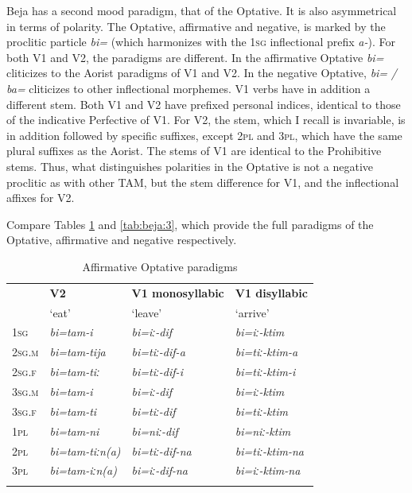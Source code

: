 \documentclass[output=paper,colorlinks,citecolor=brown]{langscibook}
\begin{document}
Beja has a second mood paradigm, that of the Optative. It is also asymmetrical in terms of polarity. The Optative, affirmative and negative, is marked by the proclitic particle \textit{bi=} (which harmonizes with the 1\textsc{sg} inflectional prefix \textit{a-}). For both V1 and V2, the paradigms are different. In the affirmative Optative \textit{bi=} cliticizes to the Aorist paradigms of V1 and V2. In the negative Optative, \textit{bi=} \textit{/ ba=} cliticizes to other inflectional morphemes. V1 verbs have in addition a different stem. Both V1 and V2 have prefixed personal indices, identical to those of the indicative Perfective of V1. For V2, the stem, which I recall is invariable, is in addition followed by specific suffixes, except 2\textsc{pl} and 3\textsc{pl}, which have the same plural suffixes as the Aorist. The stems of V1 are identical to the Prohibitive stems. Thus, what distinguishes polarities in the Optative is not a negative proclitic as with other TAM, but the stem difference for V1, and the inflectional affixes for V2.

Compare Tables \ref{tab:beja:2} and \ref{tab:beja:3}, which provide the full paradigms of the Optative, affirmative and negative respectively.

\begin{table}
\begin{tabularx}{\textwidth}{lXXl}
\lsptoprule 
& {\bfseries V2} & {\bfseries V1 monosyllabic} & {\bfseries V1 disyllabic} \\
& { ‘eat’} & { ‘leave’} & { ‘arrive’}\\
\midrule 
{\scshape 1sg} & \textit{bi=tam-i} & \textit{bi=iː-dif} & \textit{bi=iː-ktim}\\
{\scshape 2sg.m} & \textit{bi=tam-tija} & \textit{bi=tiː-dif-a} & \textit{bi=tiː-ktim-a}\\
{\scshape 2sg.f} & \textit{bi=tam-tiː} & \textit{bi=tiː-dif-i} & \textit{bi=tiː-ktim-i}\\
{\scshape 3sg.m} & \textit{bi=tam-i} & \textit{bi=iː-dif} & \textit{bi=iː-ktim}\\
{\scshape 3sg.f} & \textit{bi=tam-ti} & \textit{bi=tiː-dif} & \textit{bi=tiː-ktim}\\
{\scshape 1pl} & \textit{bi=tam-ni} & \textit{bi=niː-dif} & \textit{bi=niː-ktim}\\
{\scshape 2pl} & \textit{bi=tam-tiːn(a)} & \textit{bi=tiː-dif-na} & \textit{bi=tiː-ktim-na}\\
{\scshape 3pl} & \textit{bi=tam-iːn(a)} & \textit{bi=iː-dif-na} & \textit{bi=iː-ktim-na}\\
\lspbottomrule
\end{tabularx}
\caption{Affirmative Optative paradigms}
\label{tab:beja:2} 
\end{table}
\end{document}
